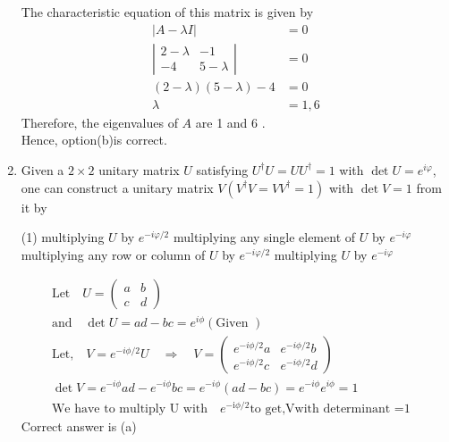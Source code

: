 \begin{enumerate}[label=\color{ocre}\textbf{\arabic*.}]
\begin{answer}
$$	$$
	The characteristic equation of this matrix is given by
	$$
	\begin{aligned}
	|A-\lambda I| &=0 \\
	\left|\begin{array}{rr}
	2-\lambda & -1 \\
	-4 & 5-\lambda
	\end{array}\right| &=0 \\
	(2-\lambda)(5-\lambda)-4 &=0 \\
	\lambda &=1,6
	\end{aligned}
	$$
	Therefore, the eigenvalues of $A$ are 1 and 6 .\\Hence, option(b)is correct.
\end{answer}
\item Given a $2 \times 2$ unitary matrix $U$ satisfying $U^{\dagger} U=U U^{\dagger}=1$ with $\operatorname{det} U=e^{i \varphi}$, one can construct a
unitary matrix $V\left(V^{\dagger} V=V V^{\dagger}=1\right)$ with $\operatorname{det} V=1$ from it by
\begin{tasks}(1)
	\task[\textbf{a.}]multiplying $U$ by $e^{-i \varphi / 2}$  
	\task[\textbf{b.}] multiplying any single element of $U$ by $e^{-i \varphi}$
	\task[\textbf{c.}]multiplying any row or column of $U$ by $e^{-i \varphi / 2}$ 
	\task[\textbf{d.}]multiplying $U$ by $e^{-i \varphi}$ 
\end{tasks}
\begin{answer}
	\begin{align*}
	\text{Let}\quad U=\left(\begin{array}{ll}a & b \\ c & d\end{array}\right)&\\\text{and}\quad \operatorname{det} U=a d-b c=e^{i \phi}( \text{Given })\\\text{Let,}\quad V=e^{-i \phi / 2} U \quad \Rightarrow \quad V=\left(\begin{array}{ll}e^{-i \phi / 2} a & e^{-i \phi / 2} b \\ e^{-i \phi / 2} c & e^{-i \phi / 2} d\end{array}\right)\\
	\operatorname{det} V=e^{-i \phi} a d-e^{-i \phi} b c=e^{-i \phi}(a d-b c)=e^{-i \phi} e^{i \phi}=1\\
	\text{We have to multiply U with}\quad {e}^{-\mathrm{i} \phi / 2}
	\text{to get,}\mathrm{V}\text{with determinant =1}
	\end{align*}
	Correct answer is (a)
	

\end{answer}
\end{enumerate}

